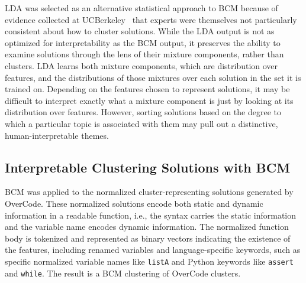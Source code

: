 LDA was selected as an alternative statistical approach to BCM because of evidence collected at UCBerkeley~\cite{} that experts were themselves not particularly consistent about how to cluster solutions. While the LDA output is not as optimized for interpretability as the BCM output, it preserves the ability to examine solutions through the lens of their mixture components, rather than clusters. LDA learns both mixture components, which are distribution over features, and the distributions of those mixtures over each solution in the set it is trained on. Depending on the features chosen to represent solutions, it may be difficult to interpret exactly what a mixture component is just by looking at its distribution over features. However, sorting solutions based on the degree to which a particular topic is associated with them may pull out a distinctive, human-interpretable themes. %



\subsection{Interpretable Clustering Solutions with BCM}

BCM was applied to the normalized cluster-representing solutions generated by OverCode. These normalized solutions encode both static and dynamic information in a readable function, i.e., the syntax carries the static information and the variable name encodes dynamic information. The normalized function body is tokenized and represented as binary vectors indicating  the existence of the features, including renamed variables and language-specific keywords, such as specific normalized variable names like \texttt{listA} and Python keywords like \texttt{assert} and \texttt{while}. The result is a BCM clustering of OverCode clusters.

